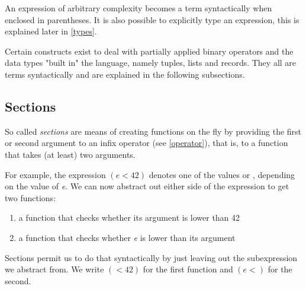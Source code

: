 An expression of arbitrary complexity becomes a term syntactically when enclosed in parentheses. It is also possible to explicitly type an expression, this is explained later in \autoref{types}.

Certain constructs exist to deal with partially applied binary operators and the data types "built in" the language, namely tuples, lists and records. They all are terms syntactically and are explained in the following subsections.

\subsection{Sections} 

\begin{flushleft}
 \sym{(}   \sym{)}
 \alt{} \sym{(}   \sym{)}
\end{flushleft}

So called \emph{sections} are means of creating functions on the fly by providing the first or second argument to an infix operator (see \autoref{operator}), that is, to a function that takes (at least) two arguments.

For example, the expression $(e < 42)$ denotes one of the values  or , depending on the value of \emph{e}.
We can now abstract out either side of the expression to get two functions:
\begin{enumerate}
\item a function that checks whether its argument is lower than 42
\item a function that checks whether \emph{e} is lower than its argument
\end{enumerate}
Sections permit us to do that syntactically by just leaving out the subexpression we abstract from. We write $( < 42)$ for the first function and $(e <)$ for the second.


